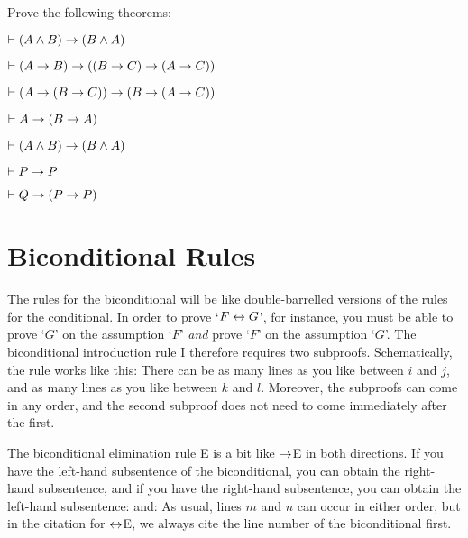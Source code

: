 \practiceproblems



\problempart
Prove the following theorems:

\begin{earg}
\item $\vdash (A \wedge  B) \rightarrow (B \wedge  A)$
\item $\vdash (A\rightarrow B)\rightarrow ((B\rightarrow C)\rightarrow (A\rightarrow C))$
\item $\vdash (A \rightarrow (B \rightarrow C)) \rightarrow (B \rightarrow (A \rightarrow C))$
\item $\vdash A \rightarrow (B \rightarrow A)$ %
\item $\vdash (A \wedge  B) \rightarrow (B \wedge  A)$
\item $\vdash P \rightarrow P$
\item $\vdash Q \rightarrow (P \rightarrow P)$
\end{earg}









\section{Biconditional Rules}
The rules for the biconditional will be like double-barrelled versions of the rules for the conditional.  In order to prove `$F \leftrightarrow G$', for instance, you must be able to prove `$G$' on the assumption `$F$' \emph{and} prove `$F$' on the assumption `$G$'. The biconditional introduction rule {\eiff}I therefore requires two subproofs. Schematically, the rule works like this:
There can be as many lines as you like between $i$ and $j$, and as many lines as you like between $k$ and $l$. Moreover, the subproofs can come in any order, and the second subproof does not need to come immediately after the first.

The biconditional elimination rule {\eiff}E is a bit like $\rightarrow$E in both directions. If you have the left-hand subsentence of the biconditional, you can obtain the right-hand subsentence, and if you have the right-hand subsentence, you can obtain the left-hand subsentence:
and:
As usual, lines $m$ and $n$ can occur in either order, but in the citation for $\leftrightarrow$E, we always cite the line number of the biconditional first.

